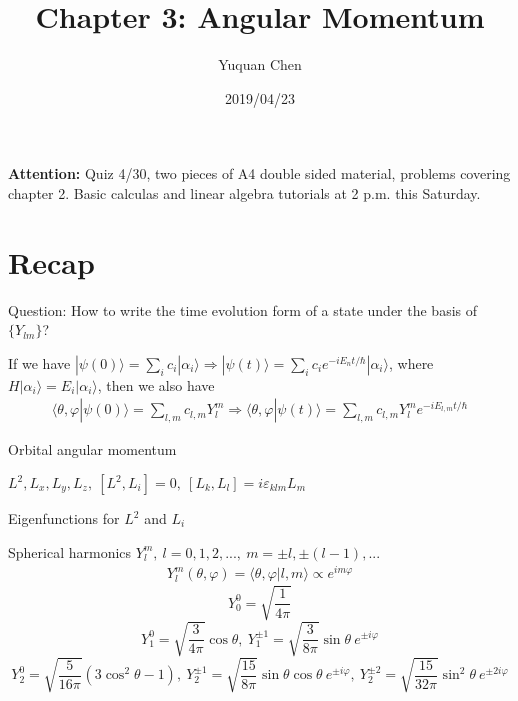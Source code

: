 \documentclass[UTF8,12pt]{article} %
\begin{document}
\title{Chapter 3: Angular Momentum}
\author{Yuquan Chen}
\date{2019/04/23} %
\maketitle

\textbf{Attention:} Quiz 4/30, two pieces of A4 double sided material, problems covering chapter 2. Basic calculas and linear algebra tutorials at 2 p.m. this Saturday.\\

\section{Recap}

Question: How to write the time evolution form of a state under the basis of $\{Y_{lm}\}$?\par
If we have $|\psi(0)\rangle = \sum_i c_i|\alpha_i\rangle \Rightarrow |\psi(t)\rangle = \sum_i c_i e^{-iE_n t/\hbar}|\alpha_i\rangle$,  where $H|\alpha_i\rangle = E_{i}|\alpha_{i}\rangle$, then we also have
\begin{align}
\langle\theta,\varphi|\psi(0)\rangle = \sum_{l,m}c_{l,m}Y_{l}^{m}\Rightarrow \langle\theta,\varphi|\psi(t)\rangle = \sum_{l,m}c_{l,m}Y_{l}^{m}e^{-iE_{l,m}t/\hbar}
\end{align}

\begin{myboxes}{Orbital angular momentum}{}
\begin{enumerate*}
\item $L^{2}, L_{x}, L_{y}, L_{z},~[L^{2},L_{i}] = 0,~[L_{k},L_{l}] = i\varepsilon_{klm} L_{m}$
\item Eigenfunctions for $L^{2}$ and $L_{i}$
\item Spherical harmonics $Y_{l}^{m},~ l = 0,1,2,...,~ m = \pm l,\pm (l-1),...$
\begin{align}
Y_{l}^{m}(\theta,\varphi) = \langle\theta,\varphi|l,m\rangle\propto e^{im\varphi}
\end{align}
$$Y_{0}^{0} = \sqrt{\frac{1}{4\pi}}$$
$$Y_{1}^{0} = \sqrt{\frac{3}{4\pi}}\cos\theta,~ Y_{1}^{\pm 1} = \sqrt{\frac{3}{8\pi}}\sin\theta ~e^{\pm i\varphi}$$
$$Y_{2}^{0} = \sqrt{\frac{5}{16\pi}}(3\cos^{2}\theta-1),~Y_{2}^{\pm1} = \sqrt{\frac{15}{8\pi}}\sin\theta\cos\theta~e^{\pm i\varphi},~Y_{2}^{\pm2} = \sqrt{\frac{15}{32\pi}}\sin^{2}\theta~e^{\pm2i\varphi}$$
\end{enumerate*}
\end{myboxes}~\\
\end{document}
